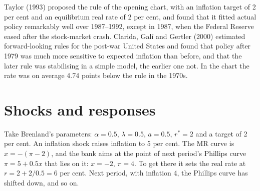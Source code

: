 \begin{record}
Taylor (1993) proposed the rule of the opening chart, with an inflation target of 2 per cent and an equilibrium real rate of 2 per cent,
and found that it fitted actual policy remarkably well over 1987--1992, except in 1987, when the Federal Reserve eased after the
stock-market crash. Clarida, Gal\'i and Gertler (2000) estimated forward-looking rules for the post-war United States and found that
policy after 1979 was much more sensitive to expected inflation than before, and that the later rule was stabilising in a
simple model, the earlier one not. In the chart the rate was on average 4.74 points below the rule in the 1970s.
\end{record}

\section{Shocks and responses}\label{sec:b2:three-equation-model:shocks}

Take Brenland's parameters: $\alpha = 0.5$, $\lambda = 0.5$, $a = 0.5$, $r^* = 2$ and a target of 2 per cent. An inflation shock raises inflation to 5 per cent. The MR curve is $x = -(\pi - 2)$, and the bank aims at the point
of next period's Phillips curve $\pi = 5 + 0.5x$ that lies on it: $x = -2$, $\pi = 4$. To get there it sets the real rate at $r = 2 + 2/0.5 = 6$ per cent. Next period, with inflation 4, the
Phillips curve has shifted down, and so on.

